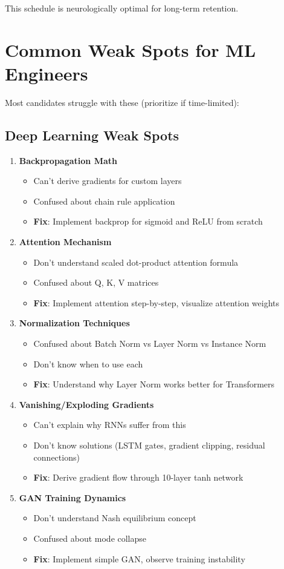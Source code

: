 \documentclass[10pt]{article}
\begin{document}
This schedule is neurologically optimal for long-term retention.

\section{Common Weak Spots for ML Engineers}

Most candidates struggle with these (prioritize if time-limited):

\subsection{Deep Learning Weak Spots}
\begin{enumerate}
\item \textbf{Backpropagation Math}
\begin{itemize}
\item Can't derive gradients for custom layers
\item Confused about chain rule application
\item \textbf{Fix}: Implement backprop for sigmoid and ReLU from scratch
\end{itemize}

\item \textbf{Attention Mechanism}
\begin{itemize}
\item Don't understand scaled dot-product attention formula
\item Confused about Q, K, V matrices
\item \textbf{Fix}: Implement attention step-by-step, visualize attention weights
\end{itemize}

\item \textbf{Normalization Techniques}
\begin{itemize}
\item Confused about Batch Norm vs Layer Norm vs Instance Norm
\item Don't know when to use each
\item \textbf{Fix}: Understand why Layer Norm works better for Transformers
\end{itemize}

\item \textbf{Vanishing/Exploding Gradients}
\begin{itemize}
\item Can't explain why RNNs suffer from this
\item Don't know solutions (LSTM gates, gradient clipping, residual connections)
\item \textbf{Fix}: Derive gradient flow through 10-layer tanh network
\end{itemize}

\item \textbf{GAN Training Dynamics}
\begin{itemize}
\item Don't understand Nash equilibrium concept
\item Confused about mode collapse
\item \textbf{Fix}: Implement simple GAN, observe training instability
\end{itemize}
\end{enumerate}
\end{document}
